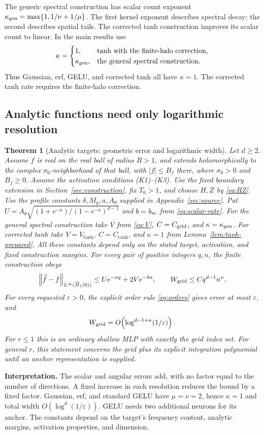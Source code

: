 \documentclass[11pt,letterpaper]{article}
\newcommand{\eps}{\varepsilon}
\newcommand{\norm}[1]{\left\lVert#1\right\rVert}
\newcommand{\Ball}{\overline B_1(0)}
\newtheorem{theorem}{Theorem}
\theoremstyle{definition}
\theoremstyle{remark}
\begin{document}
The generic spectral construction has scalar count exponent
\(\kappa_{\rm gen}=\max\{1,1/\nu+1/\mu\}\). The first kernel exponent
describes spectral decay; the second describes spatial tails. The corrected
tanh construction improves its scalar count to linear. In the main results use
\[
 \kappa=\begin{cases}1,&\text{tanh with the finite-halo correction},\\
 \kappa_{\rm gen},&\text{the general spectral construction}.
 \end{cases}
\]
Thus Gaussian, erf, GELU, and corrected tanh all have \(\kappa=1\).
The corrected tanh rate requires the finite-halo correction.

\subsection{Analytic functions need only logarithmic resolution}
\begin{theorem}[Analytic targets: geometric error and logarithmic width]\label{thm:main}
Let \(d\ge2\). Assume \(f\) is real on the real ball of radius \(R>1\),
and extends holomorphically to the complex \(\sigma_0\)-neighborhood of that
ball, with \(|f|\le B_f\) there, where \(\sigma_0>0\) and \(B_f\ge0\).
Assume the activation conditions (K1)--(K3). Use the fixed boundary
extension in Section~\ref{sec:construction}, fix \(T_0>1\), and choose
\(H,Z\) by \eqref{eq:HZ}.
Use the profile constants \(\delta,M_g,a,A_\theta\) supplied in
Appendix~\ref{sec:source}. Put
\(U=A_\theta\sqrt{(1+e^{-a})/(1-e^{-a})^{d-1}}\) and
\(b=b_{\rm sc}\) from \eqref{eq:scalar-rate}.
For the general spectral construction take \(V\) from \eqref{eq:V},
\(C=C_{\rm grid}\), and \(\kappa=\kappa_{\rm gen}\).
For corrected tanh take \(V=V_{\tanh}\), \(C=C_{\tanh}\), and \(\kappa=1\)
from Lemma~\ref{lem:tanh-prepared}. All these constants depend only on the
stated target, activation, and fixed construction margins.
For every pair of positive integers \(q,n\), the finite construction obeys
\begin{equation}\label{eq:main-finite}
 \norm{\widehat f-f}_{L^\infty(\Ball)}
       \le Ue^{-aq}+2Ve^{-bn},\qquad
 W_{\rm grid}\le Cq^{d-1}n^\kappa .
\end{equation}
For every requested \(\eps>0\), the explicit order rule
\eqref{eq:orders} gives error at most \(\eps\), and
\begin{equation}\label{eq:geometric-width}
 W_{\rm grid}=O\!\left(\log^{d-1+\kappa}(1/\eps)\right).
\end{equation}
For \(r\le1\) this is an ordinary shallow MLP with exactly the grid index set.
For general \(r\), this statement concerns the grid plus its explicit
integration polynomial until an anchor representation is supplied.
\end{theorem}
\textbf{Interpretation.} The scalar and angular errors add, with no factor
equal to the number of directions. A fixed increase in each resolution
reduces the bound by a fixed factor. Gaussian, erf, and standard
GELU have \(\mu=\nu=2\), hence \(\kappa=1\) and total width
\(O(\log^d(1/\eps))\). GELU needs two additional neurons for its anchor.
The constants depend on the target's frequency content, analytic margins,
activation properties, and dimension.
\end{document}
